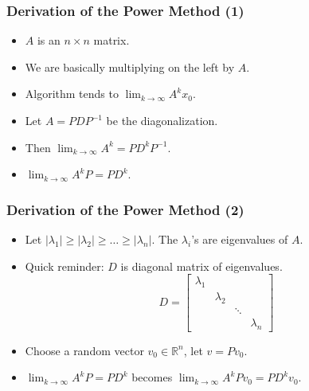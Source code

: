 \documentclass{beamer}
\begin{document}
\begin{frame}
	\frametitle{Derivation of the Power Method (1)}
	\begin{itemize}
		\item<1-> $A$ is an $n\times n$ matrix.
		\item<2-> We are basically multiplying on the left by $A$.
		\item<3-> Algorithm tends to $\displaystyle \lim_{k\to\infty}A^k x_0$.
		\item<4-> Let $A=PDP^{-1}$ be the diagonalization.
		\item<4-> Then $\displaystyle \lim_{k\to\infty}A^k=PD^kP^{-1}$.
		\item<5-> $\displaystyle \lim_{k\to\infty}A^kP=PD^k$.
	\end{itemize}
\end{frame}

\begin{frame}
	\frametitle{Derivation of the Power Method (2)}
	\begin{itemize}
		\item<1-> Let $\left|\lambda_1\right|\geq \left|\lambda_2\right|\geq\ldots\geq \left|\lambda_n\right|$. The $\lambda_i$'s are eigenvalues of $A$.
		\item<2-> Quick reminder: $D$ is diagonal matrix of eigenvalues.
			\begin{equation*}
				D=\begin{bmatrix}
					\lambda_1 &&& \\
					& \lambda_2 && \\
					&& \ddots & \\
					&&& \lambda_n
				\end{bmatrix}
			\end{equation*}
		\item<3-> Choose a random vector $v_0\in\mathbb R^n$, let $v=Pv_0$.
		\item<4-> $\displaystyle \lim_{k\to\infty}A^kP=PD^k$ becomes $\displaystyle \lim_{k\to\infty}A^kPv_0=PD^kv_0$.
	\end{itemize}
\end{frame}
\end{document}
